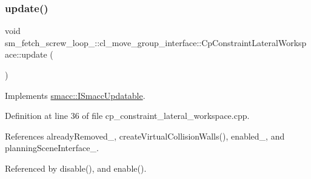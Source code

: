 \subsubsection{\texorpdfstring{update()}{update()}}
{\footnotesize\ttfamily void sm\+\_\+fetch\+\_\+screw\+\_\+loop\+\_\+::cl\+\_\+move\+\_\+group\+\_\+interface\+::\+Cp\+Constraint\+Lateral\+Workspace\+::update (\begin{DoxyParamCaption}{ }\end{DoxyParamCaption})\hspace{0.3cm}{\ttfamily [virtual]}}



Implements \hyperlink{classsmacc_1_1ISmaccUpdatable_a84ee0520cbefdb1d412bed54650b028e}{smacc\+::\+I\+Smacc\+Updatable}.



Definition at line 36 of file cp\+\_\+constraint\+\_\+lateral\+\_\+workspace.\+cpp.



References already\+Removed\+\_\+, create\+Virtual\+Collision\+Walls(), enabled\+\_\+, and planning\+Scene\+Interface\+\_\+.



Referenced by disable(), and enable().



